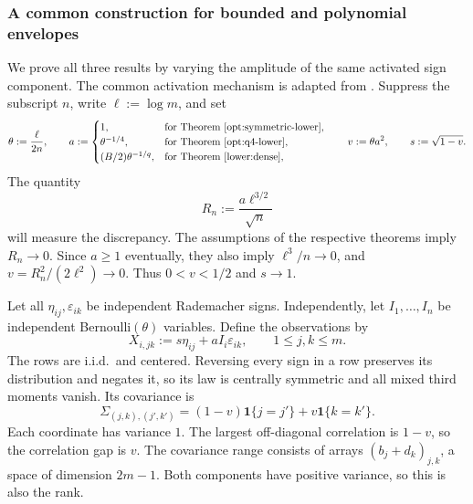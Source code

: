 \documentclass[11pt,letterpaper]{article}
\theoremstyle{remark}
\newcommand{\ind}{\mathbf 1}
\begin{document}
\subsubsection{A common construction for bounded and polynomial envelopes}

We prove all three results by varying the amplitude of the same activated sign component.
The common activation mechanism is adapted from
\cite[Proposition~E.1]{FKLZ}. Suppress the subscript \(n\), write
\(\ell:=\log m\), and set
\[
 \theta:=\frac{\ell}{2n},\qquad
 a:=\begin{cases}1,&\text{for Theorem~\ref{opt:symmetric-lower}},\\
                 \theta^{-1/4},&\text{for Theorem~\ref{opt:q4-lower}},\\
                 (B/2)\theta^{-1/q},&\text{for Theorem~\ref{lower:dense}},
    \end{cases}
 \qquad v:=\theta a^2,\qquad s:=\sqrt{1-v}.
\]
The quantity
\[
 R_n:=\frac{a\ell^{3/2}}{\sqrt n}
\]
will measure the discrepancy. The assumptions of the respective
theorems imply \(R_n\to0\). Since \(a\ge1\) eventually, they also
imply \(\ell^3/n\to0\), and
\(v=R_n^2/(2\ell^2)\to0\). Thus \(0<v<1/2\) and \(s\to1\).

Let all \(\eta_{ij},\varepsilon_{ik}\) be independent Rademacher
signs. Independently, let \(I_1,\ldots,I_n\) be independent
Bernoulli\((\theta)\) variables. Define the observations by
\begin{equation}
 X_{i,jk}:=s\eta_{ij}+aI_i\varepsilon_{ik},\qquad
 1\le j,k\le m.
 \label{sym:eq:common-construction}
\end{equation}
The rows are i.i.d.\ and centered. Reversing every sign in a row
preserves its distribution and negates it, so its law is centrally
symmetric and all mixed third moments vanish. Its covariance is
\begin{equation}
 \Sigma_{(j,k),(j',k')}=(1-v)\ind\{j=j'\}+v\ind\{k=k'\}.
 \label{sym:eq:common-covariance}
\end{equation}
Each coordinate has variance \(1\). The largest off-diagonal
correlation is \(1-v\), so the correlation gap is \(v\).
The covariance range consists of arrays \((b_j+d_k)_{j,k}\),
a space of dimension \(2m-1\). Both components have positive
variance, so this is also the rank.
\end{document}
